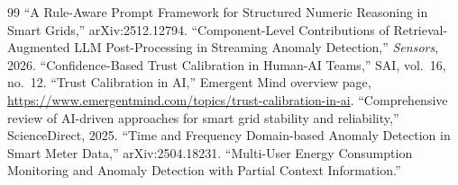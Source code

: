 \documentclass[11pt,a4paper]{article}
\begin{document}

\begin{thebibliography}{99}
 ``A Rule-Aware Prompt Framework for Structured Numeric Reasoning in Smart Grids,'' arXiv:2512.12794.
 ``Component-Level Contributions of Retrieval-Augmented LLM Post-Processing in Streaming Anomaly Detection,'' \emph{Sensors}, 2026.
 ``Confidence-Based Trust Calibration in Human-AI Teams,'' SAI, vol.~16, no.~12.
 ``Trust Calibration in AI,'' Emergent Mind overview page, \url{https://www.emergentmind.com/topics/trust-calibration-in-ai}.
 ``Comprehensive review of AI-driven approaches for smart grid stability and reliability,'' ScienceDirect, 2025.
 ``Time and Frequency Domain-based Anomaly Detection in Smart Meter Data,'' arXiv:2504.18231.
 ``Multi-User Energy Consumption Monitoring and Anomaly Detection with Partial Context Information.''
\end{thebibliography}
\end{document}
